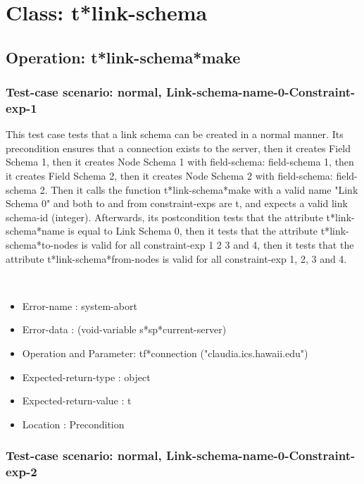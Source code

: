 \section {Class: t*link-schema}
\subsection {Operation: t*link-schema*make}
\subsubsection {Test-case scenario: normal, Link-schema-name-0-Constraint-exp-1}


This test case tests that a link schema can be created in a normal manner.
Its precondition ensures that a connection exists to the server, then it creates Field Schema 1, then it creates Node Schema 1 with field-schema: field-schema 1, then it creates Field Schema 2, then it creates Node Schema 2 with field-schema: field-schema 2.
Then it calls the function t*link-schema*make  with a valid name "Link Schema 0" and both to and from constraint-exps are t, and expects a valid link schema-id (integer).
Afterwards, its postcondition tests that the attribute t*link-schema*name is equal to Link Schema 0, then it tests that the attribute t*link-schema*to-nodes is valid for all constraint-exp 1 2 3 and 4, then it tests that the attribute t*link-schema*from-nodes is valid for all constraint-exp 1, 2, 3 and 4.


\
\begin {itemize}
\item 	Error-name             : system-abort
\item Error-data             : (void-variable s*sp*current-server)
\item Operation and Parameter: tf*connection ("claudia.ics.hawaii.edu")
\item Expected-return-type   : object
\item Expected-return-value  : t
\item Location               : Precondition



\end {itemize}
\subsubsection {Test-case scenario: normal, Link-schema-name-0-Constraint-exp-2}


